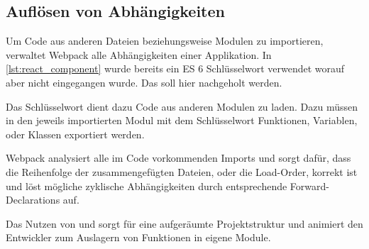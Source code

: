 \subsection{Auflösen von Abhängigkeiten}
\label{sec:gw_aufloesen_von_abhaengigkeiten}

Um Code aus anderen Dateien beziehungsweise Modulen zu importieren, verwaltet
Webpack alle Abhängigkeiten einer Applikation.  In \cref{lst:react_component}
wurde bereits ein ES 6 Schlüsselwort verwendet worauf aber nicht eingegangen
wurde.  Das soll hier nachgeholt werden.

Das Schlüsselwort  dient dazu Code aus anderen Modulen zu laden.
Dazu müssen in den jeweils importierten Modul mit dem Schlüsselwort
 Funktionen, Variablen, oder Klassen exportiert werden. 

Webpack analysiert alle im Code vorkommenden Imports und sorgt dafür, dass die
Reihenfolge der zusammengefügten Dateien, oder die Load-Order, korrekt ist und
löst mögliche zyklische Abhängigkeiten durch entsprechende Forward-Declarations
auf.

Das Nutzen von  und  sorgt für eine aufgeräumte
Projektstruktur und animiert den Entwickler zum Auslagern von Funktionen in
eigene Module.

